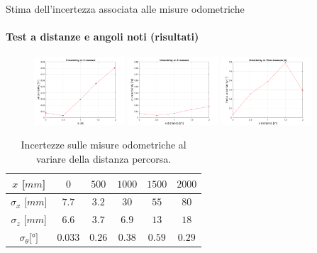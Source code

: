 \documentclass{beamer}
\begin{document}
\begin{frame}{Stima dell'incertezza associata alle misure odometriche}
\framesubtitle{Test a distanze e angoli noti (risultati)}
\begin{figure}
    \centering
    \includegraphics[width=0.3\textwidth]{images/xexpu.png}
    \includegraphics[width=0.3\textwidth]{images/zexpu.png}
    \includegraphics[width=0.3\textwidth]{images/thetaexpu.png}
\end{figure}
\begin{table}[h]
    \centering
    \begin{tabular}{|c|c|c|c|c|c|}
    \hline
       $x$ [$mm$]          & $0$ & $500$ & $1000$ & $1500$ & $2000$\\
    \hline
        $\sigma_x$ [$mm$]&  $7.7$ & $3.2$ & $30$ & $55$ & $80$\\
        $\sigma_z$ [$mm$]&  $6.6$ & $3.7$ & $6.9$ & $13$ & $18$\\
        $\sigma_{\theta} [$°$]$ & $0.033$ & $0.26$ & $0.38$ & $0.59$ & $0.29$\\
    \hline
    \end{tabular}
    \caption{Incertezze sulle misure odometriche al variare della distanza percorsa.}
    \label{tab:uncertainties}
\end{table}
\end{frame}
\end{document}
